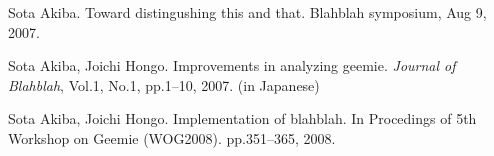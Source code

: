 \item Sota Akiba.  Toward distingushing this and that.  Blahblah symposium, Aug 9, 2007.
\item Sota Akiba, Joichi Hongo.  Improvements in analyzing geemie.  {\em Journal of Blahblah},  Vol.1, No.1, pp.1--10, 2007.  (in Japanese)
\item Sota Akiba, Joichi Hongo.  Implementation of blahblah.  In Procedings of 5th Workshop on Geemie (WOG2008).  pp.351--365, 2008.

